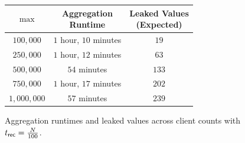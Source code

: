 \begin{figure}[h]
	\centering
	\begin{tabular}{ |c|c|c| }
		\hline
		$\max$          & \makecell{Aggregation\\ Runtime} & \makecell{Leaked Values\\(Expected)} \\
		\hline
		$100{,}000$     & $1$ hour, $10$ minutes           & $19$                                 \\
		\hline
		$250{,}000$     & $1$ hour, $12$ minutes           & $63$                                 \\
		\hline
		$500{,}000$     & $54$ minutes                     & $133$                                \\
		\hline
		$750{,}000$     & $1$ hour, $17$ minutes           & $202$                                \\
		\hline
		$1{,}000{,}000$ & $57$ minutes                     & $239$                                \\
		\hline
	\end{tabular}
	\caption{Aggregation runtimes and leaked values across client counts with $t_{\sf rec} = \frac{N}{100}$.}
	\label{fig:gpu-main-aggregation-runtimes}
\end{figure}


